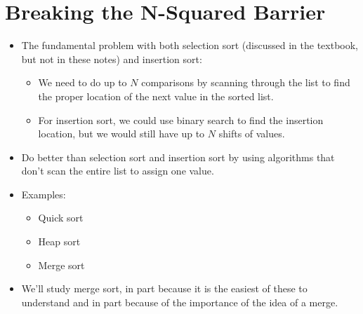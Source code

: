 \documentclass[letterpaper,10pt,english]{sphinxmanual}
\begin{document}
\section{Breaking the N-Squared Barrier}
\label{\detokenize{lecture_notes/lec21_sorting:breaking-the-n-squared-barrier}}\begin{itemize}
\item {} 
The fundamental problem with both selection sort (discussed in the
textbook, but not in these notes) and insertion sort:
\begin{itemize}
\item {} 
We need to do up to \(N\) comparisons by scanning through the
list to find the proper location of the next value in the sorted
list.

\item {} 
For insertion sort, we could use binary search to find the
insertion location, but we would still have up to \(N\) shifts
of values.

\end{itemize}

\item {} 
Do better than selection sort and insertion sort by using algorithms
that don’t scan the entire list to assign one value.

\item {} 
Examples:
\begin{itemize}
\item {} 
Quick sort

\item {} 
Heap sort

\item {} 
Merge sort

\end{itemize}

\item {} 
We’ll study merge sort, in part because it is the easiest of these to
understand and in part because of the importance of the idea of a
merge.

\end{itemize}
\end{document}
